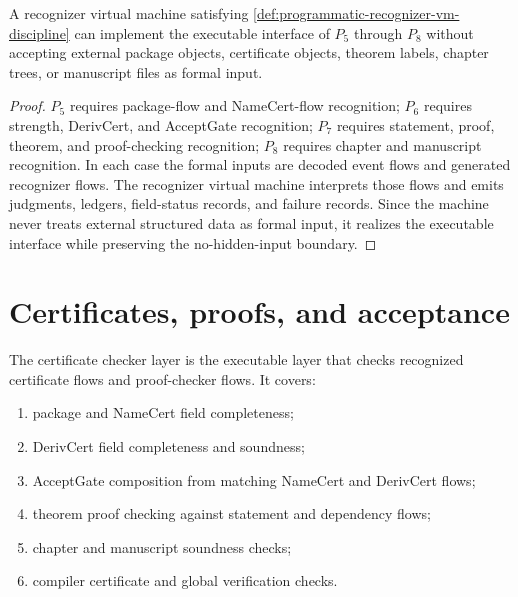 \begin{theorem}
\label{thm:programmatic-vm-realizes-p5-p8}
A recognizer virtual machine satisfying \autoref{def:programmatic-recognizer-vm-discipline} can implement the executable interface of $P_5$ through $P_8$ without accepting external package objects, certificate objects, theorem labels, chapter trees, or manuscript files as formal input.
\end{theorem}

\begin{proof}
$P_5$ requires package-flow and NameCert-flow recognition; $P_6$ requires strength, DerivCert, and AcceptGate recognition; $P_7$ requires statement, proof, theorem, and proof-checking recognition; $P_8$ requires chapter and manuscript recognition. In each case the formal inputs are decoded event flows and generated recognizer flows. The recognizer virtual machine interprets those flows and emits judgments, ledgers, field-status records, and failure records. Since the machine never treats external structured data as formal input, it realizes the executable interface while preserving the no-hidden-input boundary.
\end{proof}

\section{Certificates, proofs, and acceptance}
\label{sec:programmatic-certificates-proofs-acceptance}

\begin{definition}
\label{def:programmatic-certificate-checker-layer}
The certificate checker layer is the executable layer that checks recognized certificate flows and proof-checker flows. It covers:
\begin{enumerate}
\item package and NameCert field completeness;
\item DerivCert field completeness and soundness;
\item AcceptGate composition from matching NameCert and DerivCert flows;
\item theorem proof checking against statement and dependency flows;
\item chapter and manuscript soundness checks;
\item compiler certificate and global verification checks.
\end{enumerate}
\end{definition}

